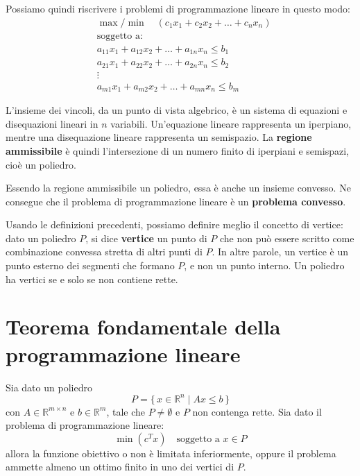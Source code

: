 \vspace{1em}

Possiamo quindi riscrivere i problemi di programmazione lineare in questo modo:
\[
\begin{aligned}
&\max/\min \quad (c_1x_1 + c_2x_2 + \ldots + c_nx_n) \\
&\text{soggetto a:} \\
&a_{11}x_1 + a_{12}x_2 + \ldots + a_{1n}x_n \leq b_1 \\
&a_{21}x_1 + a_{22}x_2 + \ldots + a_{2n}x_n \leq b_2 \\
&\vdots \\
&a_{m1}x_1 + a_{m2}x_2 + \ldots + a_{mn}x_n \leq b_m
\end{aligned}
\]

L'insieme dei vincoli, da un punto di vista algebrico, è un sistema di equazioni e disequazioni lineari in \( n \) variabili.  
Un'equazione lineare rappresenta un iperpiano, mentre una disequazione lineare rappresenta un semispazio.  
La \textbf{regione ammissibile} è quindi l'intersezione di un numero finito di iperpiani e semispazi, cioè un poliedro.

Essendo la regione ammissibile un poliedro, essa è anche un insieme convesso.  
Ne consegue che il problema di programmazione lineare è un \textbf{problema convesso}.

\vspace{1em}

Usando le definizioni precedenti, possiamo definire meglio il concetto di vertice:  
dato un poliedro \( P \), si dice \textbf{vertice} un punto di \( P \) che non può essere scritto come combinazione convessa stretta di altri punti di \( P \).  
In altre parole, un vertice è un punto esterno dei segmenti che formano \( P \), e non un punto interno.  
Un poliedro ha vertici se e solo se non contiene rette.

\section{Teorema fondamentale della programmazione lineare}

Sia dato un poliedro 
\[
P = \{\, x \in \mathbb{R}^n \mid A x \leq b \,\}
\]
con \( A \in \mathbb{R}^{m \times n} \) e \( b \in \mathbb{R}^m \), tale che \( P \neq \emptyset \) e \( P \) non contenga rette.  
Sia dato il problema di programmazione lineare:
\[
\min (c^T x) \quad \text{soggetto a } x \in P
\]
allora la funzione obiettivo o non è limitata inferiormente, oppure il problema ammette almeno un ottimo finito in uno dei vertici di \( P \).

